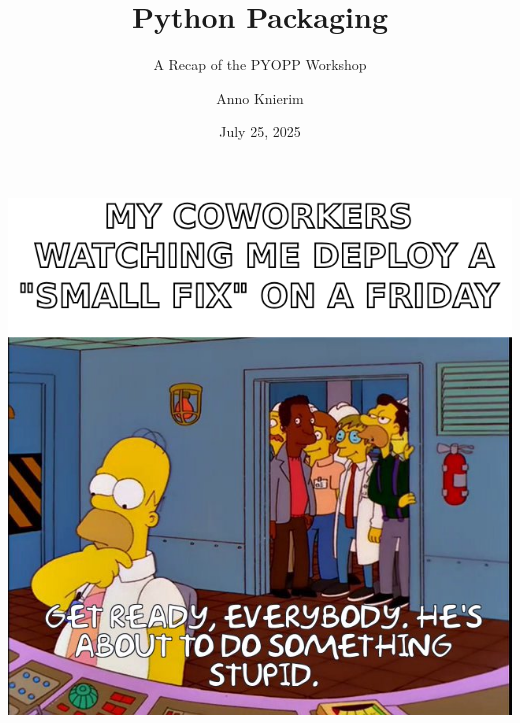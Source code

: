 \documentclass[aspectratio=1610, 9pt]{beamer}
\title{Python Packaging}
\subtitle{A Recap of the PYOPP Workshop}
\author[A.~Knierim]{Anno Knierim}
\date{July 25, 2025}
\begin{document}
\maketitle









\begin{frame}
  \begin{center}
    \includegraphics[height=0.75\textheight]{graphics/homer.png}
  \end{center}
\end{frame}
\end{document}
